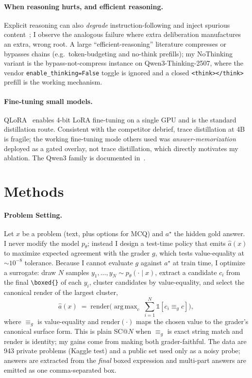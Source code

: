 \documentclass{article}
\DeclareMathOperator*{\argmax}{arg\,max}
\begin{document}
\paragraph{When reasoning hurts, and efficient reasoning.}
Explicit reasoning can also \emph{degrade} instruction-following and inject spurious
content~\citep{li2025thinkingfails}; I observe the analogous failure where extra
deliberation manufactures an extra, wrong root. A large ``efficient-reasoning''
literature compresses or bypasses chains (e.g.\ token-budgeting and no-think prefills);
my NoThinking variant is the bypass-not-compress instance on Qwen3-Thinking-2507,
where the vendor \texttt{enable\_thinking=False} toggle is ignored and a closed
\texttt{<think></think>} prefill is the working mechanism.

\paragraph{Fine-tuning small models.}
QLoRA~\citep{dettmers2023qlora} enables 4-bit LoRA fine-tuning on a single GPU and is
the standard distillation route. Consistent with the competitor debrief, trace
distillation at 4B is fragile; the working fine-tuning mode others used was
\emph{answer-memorization} deployed as a gated overlay, not trace distillation,
which directly motivates my ablation. The Qwen3 family is documented
in~\citep{qwen3report}.

\section{Methods}
\label{sec:methods}

\paragraph{Problem Setting.}
Let $x$ be a problem (text, plus options for MCQ) and $a^\star$ the hidden gold
answer. I never modify the model $p_\theta$; instead I design a test-time policy
that emits $\hat a(x)$ to maximize expected agreement with the grader $g$, which
tests value-equality at $\sim$$10^{-8}$ tolerance. Because I cannot evaluate $g$
against $a^\star$ at train time, I optimize a surrogate: draw $N$ samples
$y_1,\dots,y_N \sim p_\theta(\cdot\mid x)$, extract a candidate $c_i$ from the final
\texttt{\textbackslash boxed\{\}} of each $y_i$, cluster candidates by value-equality,
and select the canonical render of the largest cluster,
\begin{equation}
\hat a(x) \;=\; \mathrm{render}\Big(\argmax_{c}\; \textstyle\sum_{i=1}^{N}
   \mathbb{1}\!\left[c_i \equiv_g c\right]\Big),
\label{eq:sc}
\end{equation}
where $\equiv_g$ is value-equality and $\mathrm{render}(\cdot)$ maps the chosen value
to the grader's canonical surface form. This is plain SC@$N$ when $\equiv_g$ is exact
string match and $\mathrm{render}$ is identity; my gains come from making both
grader-faithful. The data are 943 private problems (Kaggle test) and a public set
used only as a noisy probe; answers are extracted from the \emph{final} boxed
expression and multi-part answers are emitted as one comma-separated box.
\end{document}
